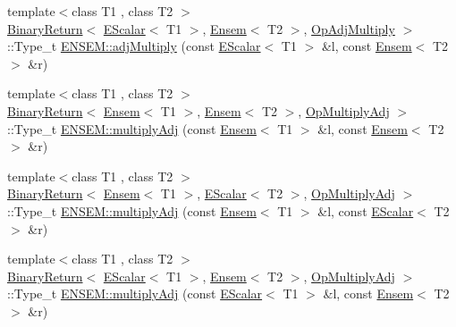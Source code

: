 \begin{DoxyCompactItemize}
{\footnotesize template$<$class T1 , class T2 $>$ }\\\mbox{\hyperlink{structENSEM_1_1BinaryReturn}{Binary\+Return}}$<$ \mbox{\hyperlink{classENSEM_1_1EScalar}{E\+Scalar}}$<$ T1 $>$, \mbox{\hyperlink{classENSEM_1_1Ensem}{Ensem}}$<$ T2 $>$, \mbox{\hyperlink{structENSEM_1_1OpAdjMultiply}{Op\+Adj\+Multiply}} $>$\+::Type\+\_\+t \mbox{\hyperlink{group__eensem_ga6ec27b863a98d9cf552c2a0194dc53f5}{E\+N\+S\+E\+M\+::adj\+Multiply}} (const \mbox{\hyperlink{classENSEM_1_1EScalar}{E\+Scalar}}$<$ T1 $>$ \&l, const \mbox{\hyperlink{classENSEM_1_1Ensem}{Ensem}}$<$ T2 $>$ \&r)
\item 
{\footnotesize template$<$class T1 , class T2 $>$ }\\\mbox{\hyperlink{structENSEM_1_1BinaryReturn}{Binary\+Return}}$<$ \mbox{\hyperlink{classENSEM_1_1Ensem}{Ensem}}$<$ T1 $>$, \mbox{\hyperlink{classENSEM_1_1Ensem}{Ensem}}$<$ T2 $>$, \mbox{\hyperlink{structENSEM_1_1OpMultiplyAdj}{Op\+Multiply\+Adj}} $>$\+::Type\+\_\+t \mbox{\hyperlink{group__eensem_gae49707140467f24b7b7a50fad851d99a}{E\+N\+S\+E\+M\+::multiply\+Adj}} (const \mbox{\hyperlink{classENSEM_1_1Ensem}{Ensem}}$<$ T1 $>$ \&l, const \mbox{\hyperlink{classENSEM_1_1Ensem}{Ensem}}$<$ T2 $>$ \&r)
\item 
{\footnotesize template$<$class T1 , class T2 $>$ }\\\mbox{\hyperlink{structENSEM_1_1BinaryReturn}{Binary\+Return}}$<$ \mbox{\hyperlink{classENSEM_1_1Ensem}{Ensem}}$<$ T1 $>$, \mbox{\hyperlink{classENSEM_1_1EScalar}{E\+Scalar}}$<$ T2 $>$, \mbox{\hyperlink{structENSEM_1_1OpMultiplyAdj}{Op\+Multiply\+Adj}} $>$\+::Type\+\_\+t \mbox{\hyperlink{group__eensem_ga8ab2ff96201bb49703846d6eb968fd11}{E\+N\+S\+E\+M\+::multiply\+Adj}} (const \mbox{\hyperlink{classENSEM_1_1Ensem}{Ensem}}$<$ T1 $>$ \&l, const \mbox{\hyperlink{classENSEM_1_1EScalar}{E\+Scalar}}$<$ T2 $>$ \&r)
\item 
{\footnotesize template$<$class T1 , class T2 $>$ }\\\mbox{\hyperlink{structENSEM_1_1BinaryReturn}{Binary\+Return}}$<$ \mbox{\hyperlink{classENSEM_1_1EScalar}{E\+Scalar}}$<$ T1 $>$, \mbox{\hyperlink{classENSEM_1_1Ensem}{Ensem}}$<$ T2 $>$, \mbox{\hyperlink{structENSEM_1_1OpMultiplyAdj}{Op\+Multiply\+Adj}} $>$\+::Type\+\_\+t \mbox{\hyperlink{group__eensem_ga54febfeb3d62a5f905b336fb99d89805}{E\+N\+S\+E\+M\+::multiply\+Adj}} (const \mbox{\hyperlink{classENSEM_1_1EScalar}{E\+Scalar}}$<$ T1 $>$ \&l, const \mbox{\hyperlink{classENSEM_1_1Ensem}{Ensem}}$<$ T2 $>$ \&r)
\item 

\end{DoxyCompactItemize}

